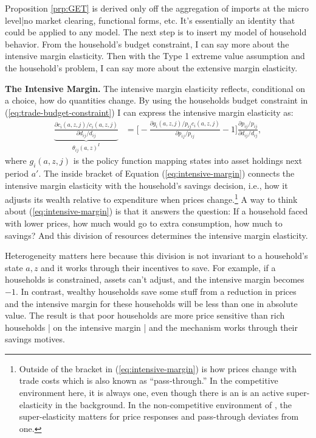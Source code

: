 \documentclass[12pt,pdftex]{article}
\begin{document}
\begin{onehalfspacing}
Proposition \ref{prp:GET} is derived only off the aggregation of imports at the micro level|no market clearing, functional forms, etc. It's essentially an identity that could be applied to any model. The next step is to insert my model of household behavior. From the household's budget constraint, I can say more about the intensive margin elasticity. Then with the Type 1 extreme value assumption and the household's problem, I can say more about the extensive margin elasticity.

\textbf{The Intensive Margin.} The intensive margin elasticity reflects, conditional on a choice, how do quantities change. By using the households budget constraint in (\ref{eq:trade-budget-constraint}) I can express the intensive margin elasticity as:
\begin{align}
\underbrace{\frac{\partial c_{i}(a,z,j)/ c_{i}(a,z,j)}{\partial d_{ij} / d_{ij}}}_{\theta_{ij}(a,z)^{I}} &= \bigg [-\frac{\partial g_{i}(a,z,j)/ p_{ij}c_{i}(a,z,j)}{\partial p_{ij}/ p_{ij}} - 1 \bigg ]\frac{\partial p_{ij}/p_{ij}}{\partial d_{ij}/ d_{ij}} ,
\label{eq:intensive-margin}
\end{align}
where $g_{i}(a,z,j)$ is the policy function mapping states into asset holdings next period $a'$. The inside bracket of Equation (\ref{eq:intensive-margin}) connects the intensive margin elasticity with the household's savings decision, i.e., how it adjusts its wealth relative to expenditure when prices change.\footnote{Outside of the bracket in (\ref{eq:intensive-margin}) is how prices change with trade costs which is also known as ``pass-through.'' In the competitive environment here, it is always one, even though there is an is an active super-elasticity in the background. In the non-competitive environment of \citet{p-iq}, the super-elasticity matters for price responses and pass-through deviates from one.} A way to think about (\ref{eq:intensive-margin}) is that it answers the question: If a household faced with lower prices, how much would go to extra consumption, how much to savings? And this division of resources determines the intensive margin elasticity.

Heterogeneity matters here because this division is not invariant to a household's state $a, z$ and it works through their incentives to save. For example, if a households is constrained, assets can't adjust, and the intensive margin becomes $-1$. In contrast, wealthy households save some stuff from a reduction in prices and the intensive margin for these households will be less than one in absolute value. The result is that poor households are more price sensitive than rich households | on the intensive margin | and the mechanism works through their savings motives.


\end{onehalfspacing}
\end{document}
